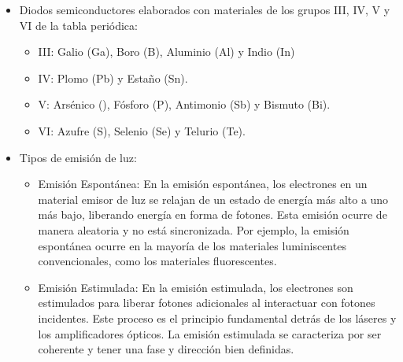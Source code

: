 \documentclass[12pt,fleqn,a4paper,oneside]{LegrandOrangeBook}
\begin{document}
\begin{itemize}
\item Diodos semiconductores elaborados con materiales de los grupos III, IV, V y VI de la tabla periódica:
\begin{itemize}
\item III: Galio (Ga), Boro (B), Aluminio (Al) y Indio (In)
\item IV: Plomo (Pb) y Estaño (Sn).
\item V: Arsénico (), Fósforo (P), Antimonio (Sb) y Bismuto (Bi).
\item VI: Azufre (S), Selenio (Se) y Telurio (Te).
\end{itemize}
\item Tipos de emisión de luz:
\begin{itemize}
\item Emisión Espontánea: En la emisión espontánea, los electrones en un material emisor de luz se relajan de un estado de energía más alto a uno más bajo, liberando energía en forma de fotones. Esta emisión ocurre de manera aleatoria y no está sincronizada. Por ejemplo, la emisión espontánea ocurre en la mayoría de los materiales luminiscentes convencionales, como los materiales fluorescentes.
\item Emisión Estimulada: En la emisión estimulada, los electrones son estimulados para liberar fotones adicionales al interactuar con fotones incidentes. Este proceso es el principio fundamental detrás de los láseres y los amplificadores ópticos. La emisión estimulada se caracteriza por ser coherente y tener una fase y dirección bien definidas.
\end{itemize}
\end{itemize}
\end{document}
